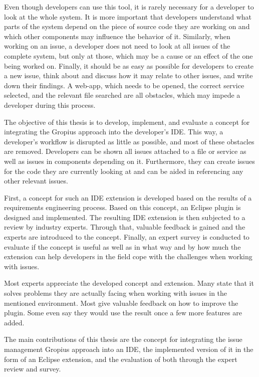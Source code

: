 Even though developers can use this tool, it is rarely necessary for a developer to look at the whole system. 
It is more important that developers understand what parts of the system depend on the piece of source code they are working on and which other components may influence the behavior of it. 
Similarly, when working on an issue, a developer does not need to look at all issues of the complete system, but only at those, which may be a cause or an effect of the one being worked on. 
Finally, it should be as easy as possible for developers to create a new issue, think about and discuss how it may relate to other issues, and write down their findings.
A web-app,  which needs to be opened, the correct service selected, and the relevant file searched are all obstacles, which may impede a developer during this process. 

The objective of this thesis is to develop, implement, and evaluate a concept for integrating the \gls{Gropius} approach into the developer's \gls{IDE}.
This way, a developer's workflow is disrupted as little as possible, and most of these obstacles are removed.
Developers can be shown all issues attached to a file or service as well as issues in components depending on it.
Furthermore, they can create issues for the code they are currently looking at and can be aided in referencing any other relevant issues.

First, a concept for such an \gls{IDE} extension is developed based on the results of a requirements engineering process.
Based on this concept, an \gls{Eclipse} plugin is designed and implemented.
The resulting \gls{IDE} extension is then subjected to a review by industry experts.
Through that, valuable feedback is gained and the experts are introduced to the concept.
Finally, an expert survey is conducted to evaluate if the concept is useful 
as well as in what way and by how much the extension can help developers in the field cope with the challenges when working with issues.

Most experts appreciate the developed concept and extension.
Many state that it solves problems they are actually facing when working with issues in the mentioned environment.
Most give valuable feedback on how to improve the plugin.
Some even say they would use the result once a few more features are added.

The main contributions of this thesis are the concept for integrating the issue management \gls{Gropius} approach into an \gls{IDE},
the implemented version of it in the form of an \gls{Eclipse} extension, and the evaluation of both through the expert review and survey.

